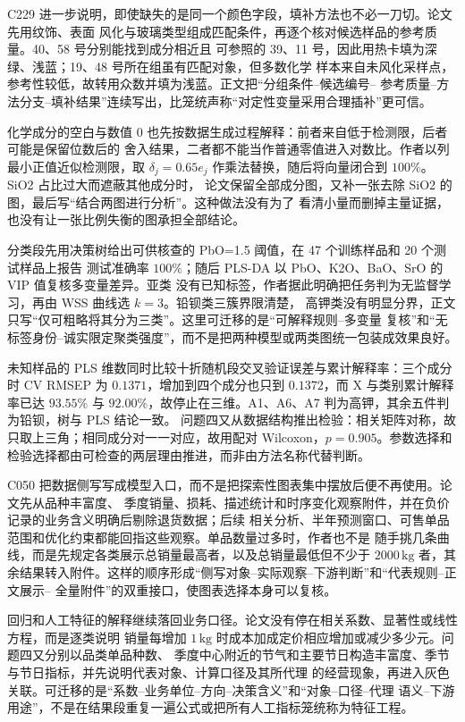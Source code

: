 \documentclass[UTF8,a4paper,12pt]{ctexart}
\begin{document}
C229 进一步说明，即使缺失的是同一个颜色字段，填补方法也不必一刀切。论文先用纹饰、表面
风化与玻璃类型组成匹配条件，再逐个核对候选样品的参考质量。40、58 号分别能找到成分相近且
可参照的 39、11 号，因此用热卡填为深绿、浅蓝；19、48 号所在组虽有匹配对象，但多数化学
样本来自未风化采样点，参考性较低，故转用众数并填为浅蓝。正文把“分组条件--候选编号--
参考质量--方法分支--填补结果”连续写出，比笼统声称“对定性变量采用合理插补”更可信。

化学成分的空白与数值 0 也先按数据生成过程解释：前者来自低于检测限，后者可能是保留位数后的
舍入结果，二者都不能当作普通零值进入对数比。作者以列最小正值近似检测限，取
$\delta_j=0.65e_j$ 作乘法替换，随后将向量闭合到 $100\%$。SiO2 占比过大而遮蔽其他成分时，
论文保留全部成分图，又补一张去除 SiO2 的图，最后写“结合两图进行分析”。这种做法没有为了
看清小量而删掉主量证据，也没有让一张比例失衡的图承担全部结论。

分类段先用决策树给出可供核查的 PbO=1.5 阈值，在 47 个训练样品和 20 个测试样品上报告
测试准确率 $100\%$；随后 PLS-DA 以 PbO、K2O、BaO、SrO 的 VIP 值复核多变量差异。亚类
没有已知标签，作者据此明确把任务判为无监督学习，再由 WSS 曲线选 $k=3$。铅钡类三簇界限清楚，
高钾类没有明显分界，正文只写“仅可粗略将其分为三类”。这里可迁移的是“可解释规则--多变量
复核”和“无标签身份--诚实限定聚类强度”，而不是把两种模型或两类图统一包装成效果良好。

未知样品的 PLS 维数同时比较十折随机段交叉验证误差与累计解释率：三个成分时 CV RMSEP 为
$0.1371$，增加到四个成分也只到 $0.1372$，而 X 与类别累计解释率已达 $93.55\%$ 与
$92.00\%$，故停止在三维。A1、A6、A7 判为高钾，其余五件判为铅钡，树与 PLS 结论一致。
问题四又从数据结构推出检验：相关矩阵对称，故只取上三角；相同成分对一一对应，故用配对
Wilcoxon，$p=0.905$。参数选择和检验选择都由可检查的两层理由推进，而非由方法名称代替判断。

C050 把数据侧写写成模型入口，而不是把探索性图表集中摆放后便不再使用。论文先从品种丰富度、
季度销量、损耗、描述统计和时序变化观察附件，并在负价记录的业务含义明确后剔除退货数据；后续
相关分析、半年预测窗口、可售单品范围和优化约束都能回指这些观察。单品数量过多时，作者也不是
随手挑几条曲线，而是先规定各类展示总销量最高者，以及总销量最低但不少于 $2000\,\mathrm{kg}$
者，其余结果转入附件。这样的顺序形成“侧写对象--实际观察--下游判断”和“代表规则--正文展示--
全量附件”的双重接口，使图表选择本身可以复核。

回归和人工特征的解释继续落回业务口径。论文没有停在相关系数、显著性或线性方程，而是逐类说明
销量每增加 $1\,\mathrm{kg}$ 时成本加成定价相应增加或减少多少元。问题四又分别以品类单品种数、
季度中心附近的节气和主要节日构造丰富度、季节与节日指标，并先说明代表对象、计算口径及其所代理
的经营现象，再进入灰色关联。可迁移的是“系数--业务单位--方向--决策含义”和“对象--口径--代理
语义--下游用途”，不是在结果段重复一遍公式或把所有人工指标笼统称为特征工程。
\end{document}
